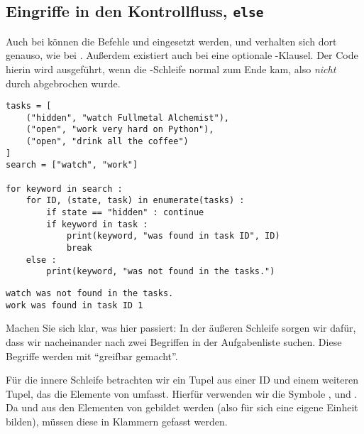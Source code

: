 
\subsection{Eingriffe in den Kontrollfluss, \texttt{else}}
Auch bei  können die Befehle  und  eingesetzt werden, und verhalten sich dort genauso, wie bei . Außerdem existiert auch bei  eine optionale -Klausel. Der Code hierin wird ausgeführt, wenn die -Schleife normal zum Ende kam, also \emph{nicht} durch  abgebrochen wurde.

\begin{codebox}
\begin{verbatim}
tasks = [
    ("hidden", "watch Fullmetal Alchemist"),
    ("open", "work very hard on Python"),
    ("open", "drink all the coffee")
]
search = ["watch", "work"]

for keyword in search :
    for ID, (state, task) in enumerate(tasks) :
        if state == "hidden" : continue
        if keyword in task :
            print(keyword, "was found in task ID", ID)
            break
    else :
        print(keyword, "was not found in the tasks.")
\end{verbatim}
\end{codebox}

\begin{cmdbox}
\begin{verbatim}
watch was not found in the tasks.
work was found in task ID 1
\end{verbatim}
\end{cmdbox}

Machen Sie sich klar, was hier passiert: In der äußeren Schleife sorgen wir dafür, dass wir nacheinander nach zwei Begriffen in der Aufgabenliste suchen. Diese Begriffe werden mit  \enquote{greifbar gemacht}.

Für die innere Schleife betrachten wir ein Tupel aus einer ID und einem weiteren Tupel, das die Elemente von  umfasst. Hierfür verwenden wir die Symbole ,  und . Da  und  aus den Elementen von  gebildet werden (also für sich eine eigene Einheit bilden), müssen diese in Klammern gefasst werden.


